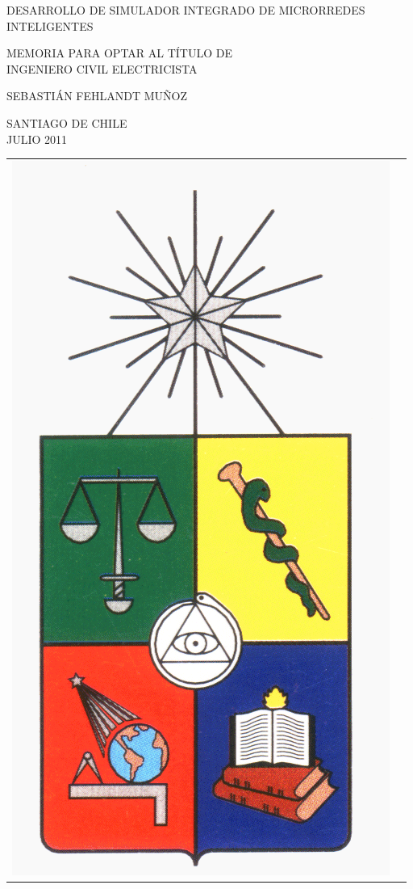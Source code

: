 \documentclass[11pt,oneside,letterpaper,leqno]{report}
\newcommand{\memtitle}{Desarrollo de Simulador Integrado de Microrredes Inteligentes}
\newcommand{\autor}{Sebastián Fehlandt Muñoz}
\newcommand{\fecha}{Julio 2011}
\newcommand{\tipomemoria}{INGENIERO CIVIL ELECTRICISTA}
\newcommand{\Memtitle}{\MakeUppercase{\memtitle}}
\newcommand{\Author}{\MakeUppercase{\autor}}
\newcommand{\Fecha}{\MakeUppercase{\fecha}}
\begin{document}
\begin{center}
\vspace{4cm}

\Memtitle

\vspace{2cm}

MEMORIA PARA OPTAR AL TÍTULO DE\\
\tipomemoria

\vspace{3cm}

\Author

\vfill
SANTIAGO DE CHILE\\
\Fecha
\end{center}

\newpage
\thispagestyle{empty}
\begin{center}

\begin{tabular}{rl}
\multirow{5}{*}{\includegraphics[scale=0.1]{Figuras/escudoU.png}} &\\


\end{tabular}
\end{center}
\end{document}
